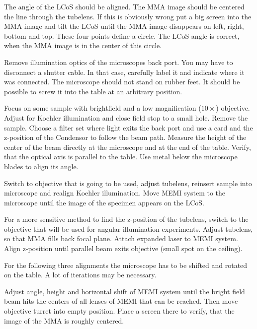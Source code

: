 \documentclass{scrartcl}
\begin{document}
 The angle of the LCoS should be aligned. The MMA
image should be centered the line through the tubelens. If this is
obviously wrong put a big screen into the MMA image and tilt the LCoS
until the MMA image disappears on left, right, bottom and top. These
four points define a circle. The LCoS angle is correct, when the MMA
image is in the center of this circle.


 Remove illumination optics of the microscopes
back port. You may have to disconnect a shutter cable. In that case,
carefully label it and indicate where it was connected.  The
microscope should not stand on rubber feet. It should be possible to
screw it into the table at an arbitrary position.


 Focus on some sample with
brightfield and a low magnification ($10\times$) objective. Adjust for
Koehler illumination and close field stop to a small hole. Remove the
sample. Choose a filter set where light exits the back port and use a
card and the z-position of the Condensor to follow the beam
path. Measure the height of the center of the beam directly at the
microscope and at the end of the table. Verify, that the optical axis
is parallel to the table. Use metal below the microscope blades to
align its angle.


 Switch to objective that is going
to be used, adjust tubelens, reinsert sample into microscope and
realign Koehler illumination.  Move MEMI system to the microscope
until the image of the specimen appears on the LCoS.

 For a more sensitive
method to find the z-position of the tubelens, switch to the objective
that will be used for angular illumination experiments. Adjust
tubelens, so that MMA fills back focal plane. Attach expanded laser to
MEMI system. Align z-position until parallel beam exits objective
(small spot on the ceiling).


For the following three alignments the microscope has to be shifted and
rotated on the table. A lot of iterations may be necessary.

 Adjust angle, height and horizontal shift of
MEMI system until the bright field beam hits the centers of all lenses
of MEMI that can be reached.  Then move objective turret into empty
position. Place a screen there to verify, that the image of the MMA is
roughly centered.
\end{document}
